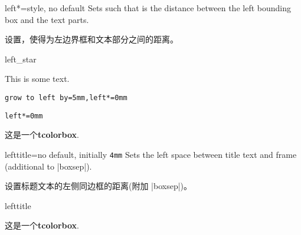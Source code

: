 \begin{docTcbKey}[][doc new=2017-02-16]{left*}{=}{style, no default}
Sets  such that  is the distance between
the left bounding box and the text parts.

设置，使得为左边界框和文本部分之间的距离。


\begin{exdispExample}{left_star}

This is some text.
\begin{tcolorbox}[grow to left by=5mm,left*=0mm,
enhanced,show bounding box]
\verb|grow to left by=5mm,left*=0mm|
\end{tcolorbox}

\begin{tcolorbox}[left*=0mm,
enhanced,show bounding box]
\verb|left*=0mm|
\end{tcolorbox}

\begin{tcolorbox}
这是一个\textbf{tcolorbox}.
\end{tcolorbox}
\end{exdispExample}
\end{docTcbKey}






\begin{docTcbKey}{lefttitle}{=}{no default, initially \texttt{4mm}}
  Sets the left space between title text and frame (additional to |boxsep|).

设置标题文本的左侧同边框的距离(附加 |boxsep|)。
\begin{exdispExample}{lefttitle}

\begin{tcolorbox}[lefttitle=3cm,title=My Title]
这是一个\textbf{tcolorbox}.
\end{tcolorbox}
\end{exdispExample}
\end{docTcbKey}


